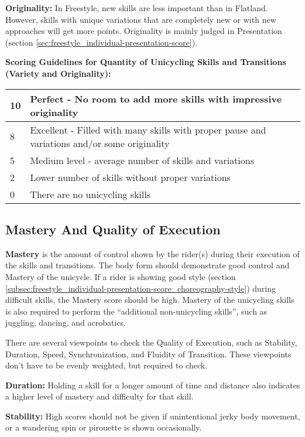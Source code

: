 \textbf{Originality:} In Freestyle, new skills are less important than in Flatland.
However, skills with unique variations that are completely new or with new approaches will get more points.
Originality is mainly judged in Presentation (section \ref{sec:freestyle_individual-presentation-score}).

\begin{minipage}{\textwidth}
\textbf{Scoring Guidelines for Quantity of Unicycling Skills and Transitions (Variety and Originality):} \\

\begin{tabular}{|l|p{12.5cm}|}
\hline
10 & Perfect - No room to add more skills with impressive originality \\
\hline
8 & Excellent - Filled with many skills with proper pause and variations and/or some originality \\
\hline
5 & Medium level - average number of skills and variations \\
\hline
2 & Lower number of skills without proper variations \\
\hline
0 & There are no unicycling skills \\
\hline
\end{tabular}
\end{minipage}

\subsection{Mastery And Quality of Execution}
\textbf{Mastery} is the amount of control shown by the rider(s) during their execution of the skills and transitions.
The body form should demonstrate good control and Mastery of the unicycle.
If a rider is showing good style (section \ref{subsec:freestyle_individual-presentation-score_choreography-style}) during difficult skills, the Mastery score should be high.
Mastery of the unicycling skills is also required to perform the ``additional non-unicycling skills'', such as juggling, dancing, and acrobatics.

There are several viewpoints to check the Quality of Execution, such as Stability, Duration, Speed, Synchronization, and Fluidity of Transition.
These viewpoints don't have to be evenly weighted, but required to check.

\textbf{Duration:} Holding a skill for a longer amount of time and distance also indicates a higher level of mastery and difficulty for that skill.

\textbf{Stability:} High scores should not be given if unintentional jerky body movement, or a wandering spin or pirouette is shown occasionally.

